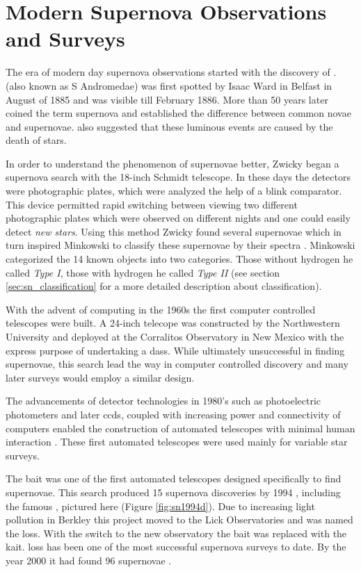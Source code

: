 \section{Modern Supernova Observations and Surveys}
\label{sec:surveys}

The era of modern day supernova observations started with the discovery of .  (also known as S Andromedae) was first spotted by Isaac Ward in Belfast in August of 1885 \citep{1885AN....112..360H} and was visible till February 1886. 
More than 50 years later \citet{1934PNAS...20..254B} coined the term supernova and established the difference between common novae and supernovae. \citet{1934PNAS...20..254B} also suggested that these luminous events are caused by the death of stars. 

In order to understand the phenomenon of supernovae better, Zwicky began a supernova search with the 18-inch Schmidt telescope. In these days the detectors were photographic plates, which were analyzed the help of  a blink comparator. This device permitted rapid switching between viewing two different photographic plates which were observed on different nights and one could easily detect \textit{new stars}. Using this method Zwicky found several supernovae which in turn inspired Minkowski to classify these supernovae by their spectra \citet{1941PASP...53..224M}. 
Minkowski categorized the 14 known objects into two categories. Those without hydrogen he called \emph{Type I}, those with hydrogen he called \emph{Type II} (see section \ref{sec:sn_classification} for a more detailed description about classification).

With the advent of computing in the 1960s the first computer controlled telescopes were built. A 24-inch telecope was constructed by the Northwestern University and deployed at the Corralitos Observatory in New Mexico with the express purpose of undertaking a \gls{dass}. While ultimately unsuccessful in finding supernovae, this search lead the way in computer controlled discovery and many later surveys would employ a similar design.

The advancements of detector technologies in 1980's such as photoelectric photometers and later \glspl{ccd}, coupled with increasing power and connectivity of computers enabled the construction of automated telescopes with minimal human interaction \citep[e.g.][]{1986IAUS..118...47G}. These first automated telescopes were used mainly for variable star surveys. 

The \gls{bait} was one of the first automated telescopes designed specifically to find supernovae. This search produced 15 supernova discoveries by 1994 \citep{1994AAS...185.7905V}, including the famous , pictured here (Figure \ref{fig:sn1994d}). Due to increasing light pollution in Berkley this project moved to the Lick Observatories and was named the \gls{loss}. With the switch to the new observatory the \gls{bait} was replaced with the \gls{kait}. \gls{loss} has been one of the most successful supernova surveys to date. By the year 2000 it had found 96 supernovae \citep{2001ASPC..246..121F}. 

